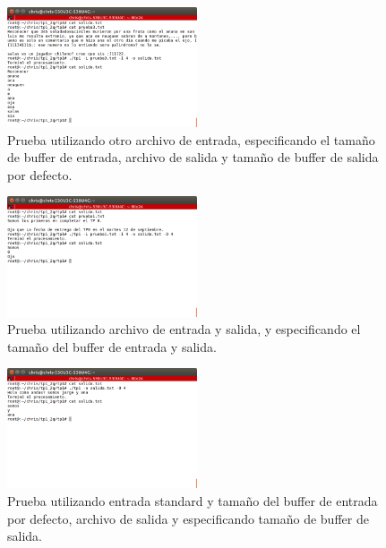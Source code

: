 \documentclass[a4paper]{article}
\begin{document}
\begin{figure}[!htp]
\begin{center}
\includegraphics[width=0.5\textwidth]{imagenes_casosDePrueba_tp1/prueba3_archivoEntrada_4_salida_default.png}
\caption{Prueba utilizando otro archivo de entrada, especificando el tamaño de buffer de entrada, archivo de salida y tamaño de buffer de salida por defecto.} \label{fig001}
\end{center}
\end{figure}

\begin{figure}[!htp]
\begin{center}
\includegraphics[width=0.5\textwidth]{imagenes_casosDePrueba_tp1/prueba1_archivoEntrada_4_salida_4.png}
\caption{Prueba utilizando archivo de entrada y salida, y especificando el tamaño del buffer de entrada y salida.} \label{fig001}
\end{center}
\end{figure}

\begin{figure}[!htp]
\begin{center}
\includegraphics[width=0.5\textwidth]{imagenes_casosDePrueba_tp1/pruebaStdin_salida_4.png}
\caption{Prueba utilizando entrada standard y tamaño del buffer de entrada por defecto, archivo de salida y especificando tamaño de buffer de salida.} \label{fig001}
\end{center}
\end{figure}
\end{document}
